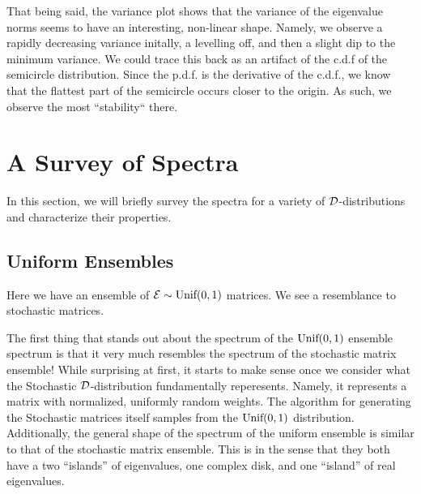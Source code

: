 That being said, the variance plot shows that the variance of the eigenvalue norms seems to have an interesting, non-linear shape. Namely, we observe a rapidly decreasing variance initally, a levelling off, and then a slight dip to the minimum variance. We could trace this back as an artifact of the c.d.f of the semicircle distribution. Since the p.d.f. is the derivative of the c.d.f., we know that the flattest part of the semicircle occurs closer to the origin. As such, we observe the most ``stability`` there.

\trim
{}%

\newpage
\section{A Survey of Spectra}

In this section, we will briefly survey the spectra for a variety of $\mathcal{D}$-distributions and characterize their properties.

\subsection{Uniform Ensembles}
Here we have an ensemble of $\mathcal{E} \sim \text{Unif}(0,1)$ matrices. We see a resemblance to
stochastic matrices.

\vspace{-1em}
\vspace{-2em}

The first thing that stands out about the spectrum of the $\text{Unif}(0,1)$ ensemble spectrum is that it very much resembles the spectrum of the stochastic matrix ensemble!
While surprising at first, it starts to make sense once we consider what the Stochastic $\mathcal{D}$-distribution fundamentally reperesents. Namely, it represents a matrix with normalized, uniformly random weights. The algorithm for generating the Stochastic matrices itself samples from the $\text{Unif}(0,1)$ distribution. Additionally, the general shape of the spectrum of the uniform ensemble is similar to that of the stochastic matrix ensemble. This is in the sense that they both have a two ``islands'' of eigenvalues, one complex disk, and one ``island'' of real eigenvalues. \newline


